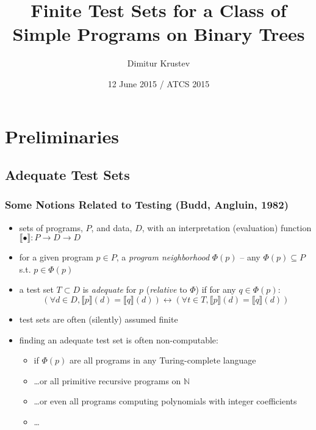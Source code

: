 \documentclass{beamer}
\title[Tests for Simple Programs on Trees]
  {Finite Test Sets for a Class of Simple Programs on Binary Trees}
\author{Dimitur Krustev}
\institute[IGE+XAO Balkan]
{
  IGE+XAO Balkan \\ \vspace{0.3cm} \pgfuseimage{mylogo1}
}
\date[ATCS 2015]{12 June 2015 / ATCS 2015}
\begin{document}
\begin{frame}
\maketitle
\end{frame}

\begin{frame}
  \tableofcontents
\end{frame}

\section{Preliminaries}

\subsection{Adequate Test Sets}

\begin{frame}
  \frametitle{Some Notions Related to Testing (Budd, Angluin, 1982)}
  \begin{itemize}
    \item sets of programs, $P$, and data, $D$, with an interpretation (evaluation) function 
      $\llbracket \bullet \rrbracket : P \rightarrow D \rightarrow D$
    \item for a given program $p \in P$, a \emph{program neighborhood} $\Phi(p)$ -- any
      $\Phi(p) \subseteq P$ s.t. $p \in \Phi(p)$
    \item a test set $T \subset D$ is \emph{adequate} for $p$ (\emph{relative} to $\Phi$)
      if for any $q \in \Phi(p)$:
      \[(\forall d \in D, \llbracket p \rrbracket (d) = \llbracket q \rrbracket (d))
        \leftrightarrow 
        (\forall t \in T, \llbracket p \rrbracket (d) = \llbracket q \rrbracket (d))
      \]
    \item test sets are often (silently) assumed finite
    \item finding an adequate test set is often non-computable:
      \begin{itemize}
        \item if $\Phi(p)$ are all programs in any Turing-complete language
        \item \ldots or all primitive recursive programs on $\mathbb{N}$
        \item \ldots or even all programs computing polynomials with integer coefficients 
        \item \ldots
      \end{itemize}
  \end{itemize}
\end{frame}
\end{document}
